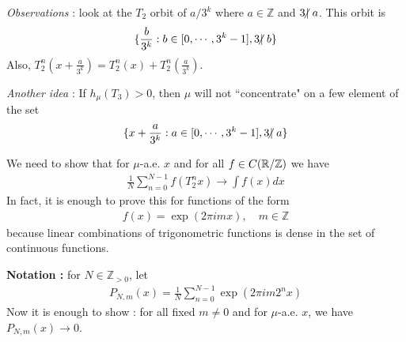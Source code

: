 \documentclass[12pt,a4paper]{report}
\begin{document}
\textit{Observations} : look at the $T_2$ orbit of $a/3^k$ where $a\in  \mathbb{Z}$ and $3 \hspace{-5pt}\not|\hspace{3pt} a$. This orbit is
\begin{align*}
\{ \frac{b}{3^k} : b\in [0, \cdots, 3^{k} -1], 3\hspace{-5pt}\not|\hspace{3pt} b \}
\end{align*}
Also, $T_2^n (x+ \frac{a}{3^k}) = T_2^n (x) + T_2^n (\frac{a}{3^k})$. 
\s

\textit{Another idea} : If $h_{\mu}(T_3) >0$, then $\mu$ will not ``concentrate" on a few element of the set
\begin{align*}
\{ x+ \frac{a}{3^k} : a\in [0, \cdots, 3^k -1], 3\hspace{-5pt}\not|\hspace{3pt} a \}
\end{align*}
\s

We need to show that for $\mu$-a.e. $x$ and for all $f\in C(\mathbb{R}/\mathbb{Z})$ we have 
\begin{align*}
\frac{1}{N} \sum_{n=0}^{N-1} f(T_2^n x) \rightarrow \int f(x) dx
\end{align*}
In fact, it is enough to prove this for functions of the form
\begin{align*}
f(x) = \exp(2\pi imx), \quad m\in \mathbb{Z}
\end{align*}
because linear combinations of trigonometric functions is dense in the set of continuous functions.
\s

\textbf{Notation :} for $N\in \mathbb{Z}_{>0}$, let
\begin{align*}
P_{N,m}(x) = \frac{1}{N} \sum_{n=0}^{N-1} \exp(2\pi im 2^n x)
\end{align*}
Now it is enough to show : for all fixed $m \neq 0$ and for $\mu$-a.e. $x$, we have $P_{N,m}(x) \rightarrow 0$.
\s
\end{document}
